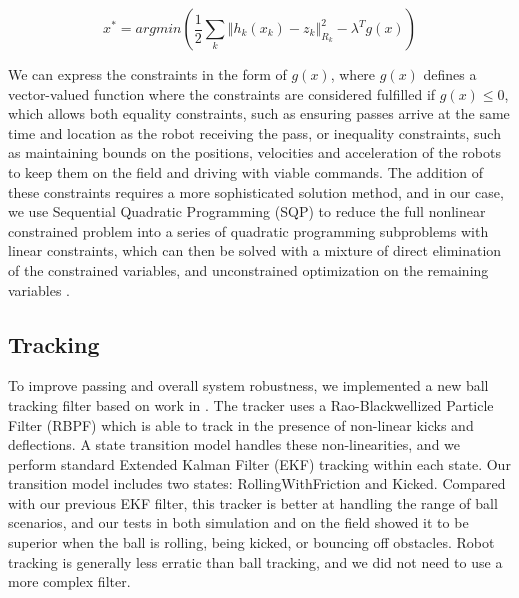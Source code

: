 \begin{equation} \label{constraints}
x^{*} = argmin(\frac{1}{2}\sum_{k}\left\Vert h_{k}(x_{k})-z_{k}\right\Vert _{R_{k}}^{2}-\lambda^{T} g(x))
\end{equation} 

We can express the constraints in the form of $g(x)$, where $g(x)$ defines a vector-valued function where the constraints are considered fulfilled if $g(x)\leq 0$, which allows both equality constraints, such as ensuring passes arrive at the same time and location as the robot receiving the pass, or inequality constraints, such as maintaining bounds on the positions, velocities and acceleration of the robots to keep them on the field and driving with viable commands.  The addition of these constraints requires a more sophisticated solution method, and in our case, we use Sequential Quadratic Programming (SQP) to reduce the full nonlinear constrained problem into a series of quadratic programming subproblems with linear constraints, which can then be solved with a mixture of direct elimination of the constrained variables, and unconstrained optimization on the remaining variables \cite{Fletcher87book}. 

\subsection{Tracking}
To improve passing and overall system robustness, we implemented a new ball tracking filter based on work in \cite{kwok2004map}. The tracker uses a Rao-Blackwellized Particle Filter (RBPF) which is able to track in the presence of non-linear kicks and deflections. A state transition model handles these non-linearities, and we perform standard Extended Kalman Filter (EKF) tracking within each state. Our transition model includes two states: RollingWithFriction and Kicked. Compared with our previous EKF filter, this tracker is better at handling the range of ball scenarios, and our tests in both simulation and on the field showed it to be superior when the ball is rolling, being kicked, or bouncing off obstacles. Robot tracking is generally less erratic than ball tracking, and we did not need to use a more complex filter.

